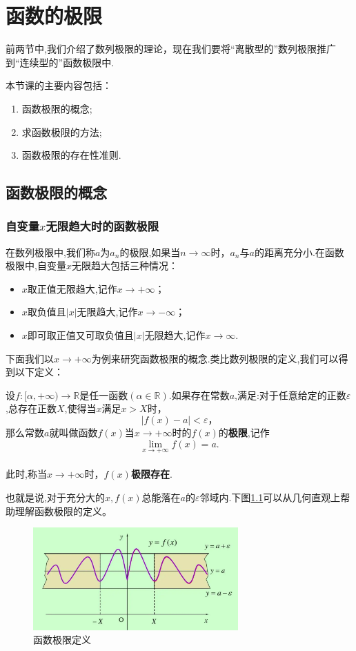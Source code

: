 \chapter{函数的极限}

前两节中,我们介绍了数列极限的理论，现在我们要将“离散型的”数列极限推广到“连续型的”函数极限中.
	
	本节课的主要内容包括：
	\begin{enumerate}
		\item 函数极限的概念;
		\item 求函数极限的方法;
		\item 函数极限的存在性准则.
	\end{enumerate}	

	\section{函数极限的概念}
	\subsection{自变量$x$无限趋大时的函数极限}
	
	在数列极限中,我们称$a$为$a_n$的极限,如果当$n \to \infty$时，$a_n$与$a$的距离充分小.在函数极限中,自变量$x$无限趋大包括三种情况： 
	\begin{itemize}
		\item $x$取正值无限趋大,记作$x \to +\infty$；
		\item $x$取负值且$\left|x\right|$无限趋大,记作$x\to -\infty$；
		\item $x$即可取正值又可取负值且$\left|x\right|$无限趋大,记作$x\to \infty$.
	\end{itemize}
	下面我们以$x \to +\infty$为例来研究函数极限的概念.类比数列极限的定义,我们可以得到以下定义：
	
	\begin{definition}
		设$f:[\alpha, +\infty) \to\mathbb{R}$是任一函数$\left(\alpha \in \mathbb{R}\right)$.如果存在常数$a$,满足:对于任意给定的正数$\varepsilon$,总存在正数$X$,使得当$x$满足$x>X$时，
		\[
		\left|f(x)-a\right|<\varepsilon，
		\]
		那么常数$a$就叫做函数$f(x)$当$x\to +\infty $时的$f(x)$的\textbf{极限},记作
		\[
		\lim_{x\to +\infty}f(x)=a.
		\]\\
		此时,称当$x\to +\infty$时，$f(x)$\textbf{极限存在}.
	\end{definition}

	也就是说,对于充分大的$x,f(x)$总能落在$a$的$\varepsilon$邻域内.下图\ref{limfun}可以从几何直观上帮助理解函数极限的定义。
	\begin{figure}[H]
		\centering
		\includegraphics[width=0.7\textwidth]{figures/limfun}
		\caption{函数极限定义}\label{limfun}
	\end{figure}
	
